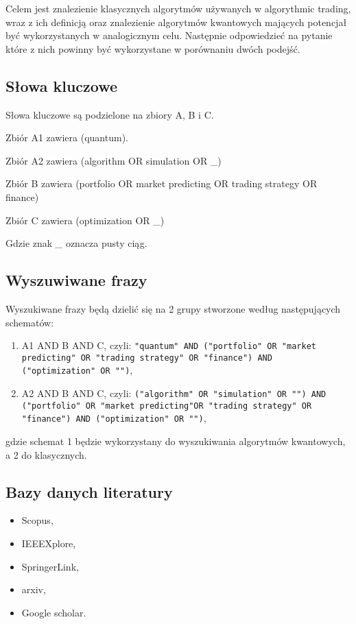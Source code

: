 \documentclass[polish,envcountsect,10pt]{article}
\begin{document}
Celem jest znalezienie klasycznych algorytmów używanych w algorythmic trading, wraz z ich definicją oraz znalezienie algorytmów kwantowych mających potencjał być wykorzystanych w analogicznym celu. 
Następnie odpowiedzieć na pytanie które z nich powinny być wykorzystane w porównaniu dwóch podejść. 

\subsection{Słowa kluczowe}
Słowa kluczowe są podzielone na zbiory A, B i C.

Zbiór A1 zawiera (quantum).

Zbiór A2 zawiera (algorithm OR simulation OR \_)

Zbiór B zawiera (portfolio OR market predicting OR trading strategy OR finance)

Zbiór C zawiera (optimization OR \_)

Gdzie znak \emph{\_} oznacza pusty ciąg.

\subsection{Wyszuwiwane frazy}
Wyszukiwane frazy będą dzielić się na 2 grupy stworzone według następujących schematów:
\begin{enumerate}
	\item A1 AND B AND C, czyli: \newline \texttt{"quantum"\ AND ("portfolio"\ OR "market predicting"\ OR "trading strategy"\ OR \linebreak"finance")\ AND ("optimization"\ OR "")},
	\item A2 AND B AND C, czyli: \newline \texttt{("algorithm"\ OR "simulation"\ OR "")\ AND ("portfolio"\ OR "market predicting"\linebreak OR "trading strategy"\ OR "finance")\ AND ("optimization"\ OR "")},
\end{enumerate} 
gdzie schemat 1 będzie wykorzystany do wyszukiwania algorytmów kwantowych, a 2 do klasycznych. 

\subsection{Bazy danych literatury}

\begin{itemize}
	\item Scopus,
	\item IEEEXplore,
	\item SpringerLink,
	\item arxiv,
	\item Google scholar.
\end{itemize}
\end{document}
